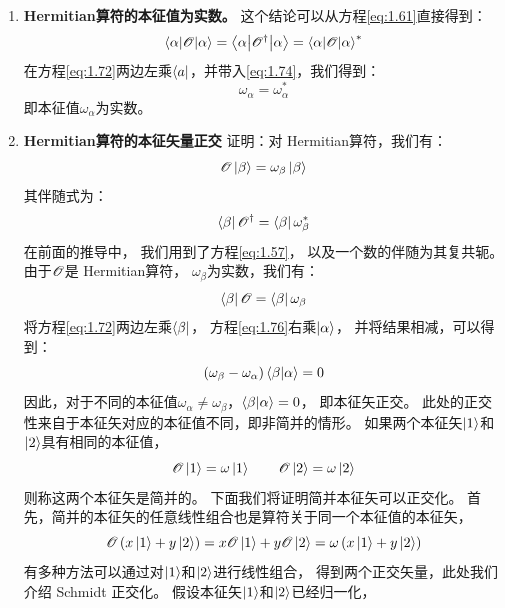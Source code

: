 \begin{enumerate}
 \item {\bfseries Hermitian算符的本征值为实数。} 这个结论可以从方程\eqref{eq:1.61}直接得到：
 \begin{equation}
     \left\langle \alpha\middle\vert \mathscr{O} \middle\vert \alpha\right\rangle = \left\langle\alpha\middle\vert\mathscr{O}^\dagger\middle\vert\alpha\right\rangle = {\left\langle \alpha\middle\vert \mathscr{O} \middle\vert \alpha\right\rangle}^\ast
     \label{eq:1.74}
 \end{equation}
 在方程\eqref{eq:1.72}两边左乘$\Bra{a}$，并带入\eqref{eq:1.74}，我们得到：
 \begin{equation}
     \omega_\alpha = \omega_\alpha^\ast
     \label{eq:1.75}
 \end{equation}
 即本征值$\omega_\alpha$为实数。
 
 \item {\bfseries Hermitian算符的本征矢量正交} 证明：对 Hermitian算符，我们有：
 \[\mathscr{O}\Ket{\beta} = \omega_\beta \Ket{\beta}\]
 其伴随式为：
 \[\Bra{\beta}\mathscr O^\dagger = \Bra{\beta}\omega_\beta^\ast\]
 在前面的推导中，
 我们用到了方程\eqref{eq:1.57}，
 以及一个数的伴随为其复共轭。
 由于$\mathscr{O}$是 Hermitian算符，
 $\omega_\beta$为实数，我们有：
 \begin{equation}
     \Bra{\beta}\mathscr{O} = \Bra{\beta}\omega_\beta
     \label{eq:1.76}
 \end{equation}
 将方程\eqref{eq:1.72}两边左乘$\Bra{\beta}$，
 方程\eqref{eq:1.76}右乘$\Ket{\alpha}$，
 并将结果相减，可以得到：
 \begin{equation}
     \left(\omega_\beta - \omega_\alpha\right)\langle \beta \vert \alpha \rangle = 0
     \label{eq:1.77}
 \end{equation}
 因此，对于不同的本征值$\omega_\alpha \neq \omega_\beta$，$\langle \beta \vert \alpha \rangle = 0$，
 即本征矢正交。
 此处的正交性来自于本征矢对应的本征值不同，即非简并的情形。
 如果两个本征矢$\Ket{1}$和$\Ket{2}$具有相同的本征值，
 \begin{equation}
     \mathscr{O}\Ket{1} = \omega\Ket{1} \qquad \mathscr{O}\Ket{2} = \omega\Ket{2}
     \label{eq:1.78}
 \end{equation}
 则称这两个本征矢是简并的。
 下面我们将证明简并本征矢可以正交化。
 首先，简并的本征矢的任意线性组合也是算符关于同一个本征值的本征矢，
 \begin{equation}
     \mathscr{O}\left(x\Ket{1}+y\Ket{2}\right) = x\mathscr{O}\Ket{1} + y\mathscr{O}\Ket{2} = \omega\left(x\Ket{1}+y\Ket{2}\right)
     \label{eq:1.79}
 \end{equation}
 有多种方法可以通过对$\Ket{1}$和$\Ket{2}$进行线性组合，
 得到两个正交矢量，此处我们介绍 Schmidt 正交化。
 假设本征矢$\Ket{1}$和$\Ket{2}$已经归一化，

\end{enumerate}
